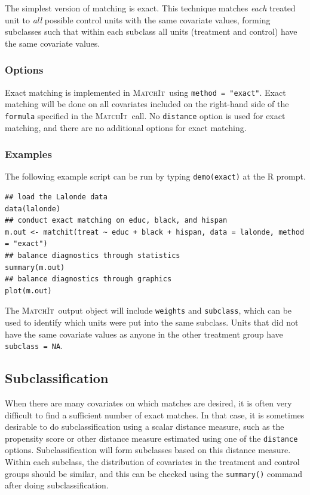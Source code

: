 \documentclass[oneside,letterpaper,titlepage]{article}
\newcommand{\MatchIt}{\textsc{MatchIt}}
\begin{document}
The simplest version of matching is exact.  This technique matches
\emph{each} treated unit to \emph{all} possible control units with the
same covariate values, forming subclasses such that within each
subclass all units (treatment and control) have the same covariate
values.

\subsubsection{Options}

Exact matching is implemented in \MatchIt\ using \texttt{method =
  "exact"}.  Exact matching will be done on all covariates included on
the right-hand side of the \texttt{formula} specified in the \MatchIt\
call.  No \texttt{distance} option is used for exact matching, and
there are no additional options for exact matching.

\subsubsection{Examples}

The following example script can be run by typing {\tt demo(exact)} at
the R prompt.

\begin{verbatim}
## load the Lalonde data
data(lalonde)
## conduct exact matching on educ, black, and hispan
m.out <- matchit(treat ~ educ + black + hispan, data = lalonde, method = "exact")
## balance diagnostics through statistics
summary(m.out)
## balance diagnostics through graphics
plot(m.out)
\end{verbatim}

The \MatchIt\ output object will include \texttt{weights} and
\texttt{subclass}, which can be used to identify which units were put
into the same subclass.  Units that did not have the same covariate
values as anyone in the other treatment group have \texttt{subclass =
  NA}.

\subsection{Subclassification}
\label{subclass}

When there are many covariates on which matches are desired, it is
often very difficult to find a sufficient number of exact matches.  In
that case, it is sometimes desirable to do subclassification using a
scalar distance measure, such as the propensity score or other
distance measure estimated using one of the \texttt{distance} options.
Subclassification will form subclasses based on this distance measure.
Within each subclass, the distribution of covariates in the treatment
and control groups should be similar, and this can be checked using
the \texttt{summary()} command after doing subclassification.
\end{document}
